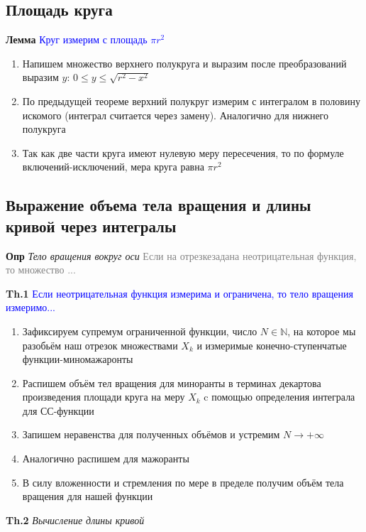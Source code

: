 \subsection{Площадь круга}

\textbf{Лемма} \textcolor{blue}{Круг измерим с площадь $\pi r^2$}

\begin{enumerate}
    \item Напишем множество верхнего полукруга и выразим после преобразований выразим $y$: $0 \leq y \leq \sqrt{
        r^2 - x^2}$
    \item По предыдущей теореме верхний полукруг измерим с интегралом в половину искомого (интеграл считается
    через замену).
    Аналогично для нижнего полукруга
    \item Так как две части круга имеют нулевую меру пересечения, то по формуле включений-исключений, мера круга
    равна $\pi r^2$
\end{enumerate}

\subsection{Выражение объема тела вращения и длины кривой через интегралы}

\textbf{Опр} \textit{Тело вращения вокруг оси} \textcolor{gray}{Если на отрезкезадана неотрицательная функция, то
множество ...}

\textbf{Th.1} \textcolor{blue}{Если неотрицательная функция измерима и ограничена, то тело вращения измеримо...}

\begin{enumerate}
    \item Зафиксируем супремум ограниченной функции, число $N \in \mathbb{N}$, на которое мы разобьём наш отрезок
    множествами $X_k$ и измеримые конечно-ступенчатые функции-миномажаронты
    \item Распишем объём тел вращения для миноранты в терминах декартова произведения площади круга на меру $X_k$ c помощью определения интеграла для СС-функции
    \item Запишем неравенства для полученных объёмов и устремим $N \rightarrow +\infty$
    \item Аналогично распишем для мажоранты
    \item В силу вложенности и стремления по мере в пределе получим объём тела вращения для нашей функции
\end{enumerate}

\textbf{Th.2} \textit{Вычисление длины кривой}

